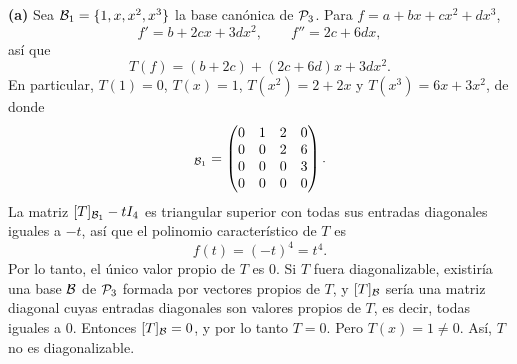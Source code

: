 \documentclass[12pt,a4paper]{article}
\begin{document}
    \begin{solucion}
        \textbf{(a)} Sea $\mathcal{B}_{1}=\{1,x,x^{2},x^{3}\}$ la base canónica de $\mathcal{P}_{3}$. Para $f=a+bx+cx^{2}+dx^{3}$,
        \begin{equation*}
            f'=b+2cx+3dx^{2},\qquad f''=2c+6dx,
        \end{equation*}
        así que
        \begin{equation*}
            T(f)=(b+2c)+(2c+6d)x+3dx^{2}.
        \end{equation*}
        En particular, $T(1)=0$, $T(x)=1$, $T(x^{2})=2+2x$ y $T(x^{3})=6x+3x^{2}$, de donde
        \begin{equation*}
            [T]_{\BB_{1}}=
            \begin{pmatrix}
                0 & 1 & 2 & 0\\
                0 & 0 & 2 & 6\\
                0 & 0 & 0 & 3\\
                0 & 0 & 0 & 0
            \end{pmatrix}.
        \end{equation*}
        La matriz $[T]_{\mathcal{B}_{1}}-tI_{4}$ es triangular superior con todas sus entradas diagonales iguales a $-t$, así que el polinomio característico de $T$ es
        \begin{equation*}
            f(t)=(-t)^{4}=t^{4}.
        \end{equation*}
        Por lo tanto, el único valor propio de $T$ es $0$. Si $T$ fuera diagonalizable, existiría una base $\mathcal{B}$ de $\mathcal{P}_{3}$ formada por vectores propios de $T$, y $[T]_{\mathcal{B}}$ sería una matriz diagonal cuyas entradas diagonales son valores propios de $T$, es decir, todas iguales a $0$. Entonces $[T]_{\mathcal{B}}=0$, y por lo tanto $T=0$. Pero $T(x)=1\neq0$. Así, $T$ no es diagonalizable.


\end{solucion}
\end{document}
